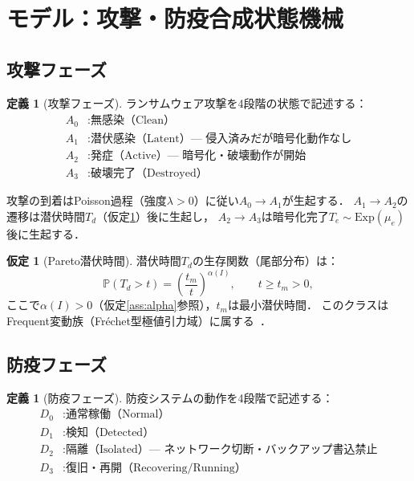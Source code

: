 \documentclass[12pt,a4paper]{article}
\theoremstyle{plain}
\theoremstyle{definition}
\newtheorem{definition}[theorem]{定義}
\newtheorem{assumption}[theorem]{仮定}
\theoremstyle{remark}
\newcommand{\Prob}{\mathbb{P}}
\newcommand{\alphI}{\alpha(I)}
\begin{document}
\section{モデル：攻撃・防疫合成状態機械}
\label{sec:model}

\subsection{攻撃フェーズ}

\begin{definition}[攻撃フェーズ]\label{def:attack}
ランサムウェア攻撃を4段階の状態で記述する：
\begin{align*}
  A_0 &: \text{無感染（Clean）}\\
  A_1 &: \text{潜伏感染（Latent）— 侵入済みだが暗号化動作なし}\\
  A_2 &: \text{発症（Active）— 暗号化・破壊動作が開始}\\
  A_3 &: \text{破壊完了（Destroyed）}
\end{align*}
\end{definition}

攻撃の到着はPoisson過程（強度$\lambda>0$）に従い$A_0\to A_1$が生起する．
$A_1\to A_2$の遷移は潜伏時間$T_d$（仮定\ref{ass:pareto}）後に生起し，
$A_2\to A_3$は暗号化完了$T_e\sim\mathrm{Exp}(\mu_e)$後に生起する．

\begin{assumption}[Pareto潜伏時間]\label{ass:pareto}
潜伏時間$T_d$の生存関数（尾部分布）は：
\begin{equation}\label{eq:pareto}
  \Prob(T_d>t) = \left(\frac{t_m}{t}\right)^{\alphI},\qquad t\ge t_m>0,
\end{equation}
ここで$\alphI>0$（仮定\ref{ass:alpha}参照），$t_m$は最小潜伏時間．
このクラスはFrequent変動族（Fréchet型極値引力域）に属する~\cite{embrechts1997}．
\end{assumption}

\subsection{防疫フェーズ}

\begin{definition}[防疫フェーズ]\label{def:defense}
防疫システムの動作を4段階で記述する：
\begin{align*}
  D_0 &: \text{通常稼働（Normal）}\\
  D_1 &: \text{検知（Detected）}\\
  D_2 &: \text{隔離（Isolated）— ネットワーク切断・バックアップ書込禁止}\\
  D_3 &: \text{復旧・再開（Recovering/Running）}
\end{align*}
\end{definition}
\end{document}
